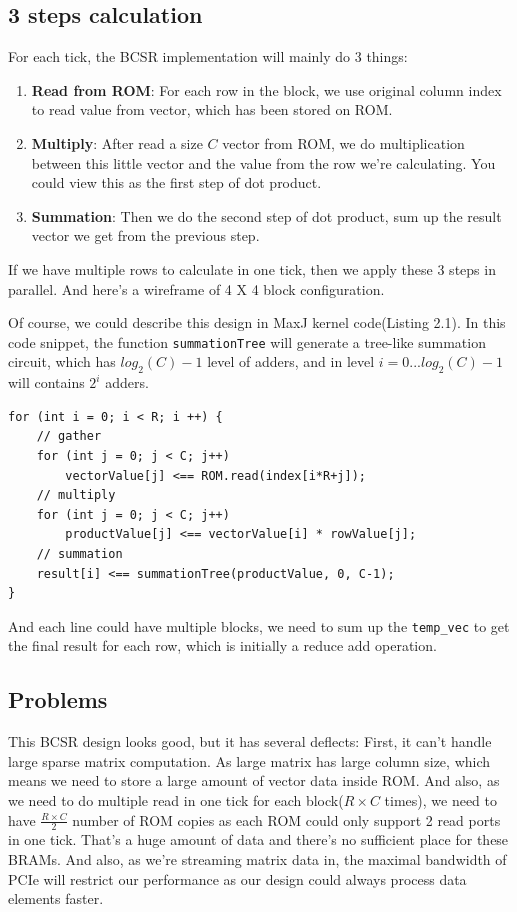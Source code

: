 \documentclass[a4paper, 10pt]{report}
\begin{document}
\subsection{3 steps calculation}
For each tick, the BCSR implementation will mainly do 3 things:
\begin{enumerate}
\item \textbf{Read from ROM}: For each row in the block, we use original column index to read value from vector, which has been stored on ROM.
\item \textbf{Multiply}: After read a size $C$ vector from ROM, we do multiplication between this little vector and the value from the row we're calculating. You could view this as the first step of dot product.
\item \textbf{Summation}: Then we do the second step of dot product, sum up the result vector we get from the previous step.
\end{enumerate}

If we have multiple rows to calculate in one tick, then we apply these 3 steps in parallel. And here's a wireframe of 4 X 4 block configuration.

Of course, we could describe this design in MaxJ kernel code(Listing 2.1). In this code snippet, the function \lstinline{summationTree} will generate a tree-like summation circuit, which has $log_2(C)-1$ level of adders, and in level $i = 0...log_2(C)-1$ will contains $2^i$ adders.

\begin{lstlisting}[caption=BCSR kernel]
for (int i = 0; i < R; i ++) {
	// gather	
	for (int j = 0; j < C; j++)	
		vectorValue[j] <== ROM.read(index[i*R+j]);
	// multiply
	for (int j = 0; j < C; j++)
		productValue[j] <== vectorValue[i] * rowValue[j];
	// summation
	result[i] <== summationTree(productValue, 0, C-1);
}
\end{lstlisting}

And each line could have multiple blocks, we need to sum up the \lstinline{temp_vec} to get the final result for each row, which is initially a reduce add operation. 

\subsection{Problems}

This BCSR design looks good, but it has several deflects: First, it can't handle large sparse matrix computation. As large matrix has large column size, which means we need to store a large amount of vector data inside ROM. And also, as we need to do multiple read in one tick for each block($R\times C$ times), we need to have $\frac{R\times C}{2}$ number of ROM copies as each ROM could only support 2 read ports in one tick. That's a huge amount of data and there's no sufficient place for these BRAMs. And also, as we're streaming matrix data in, the maximal bandwidth of PCIe will restrict our performance as our design could always process data elements faster.
\end{document}
